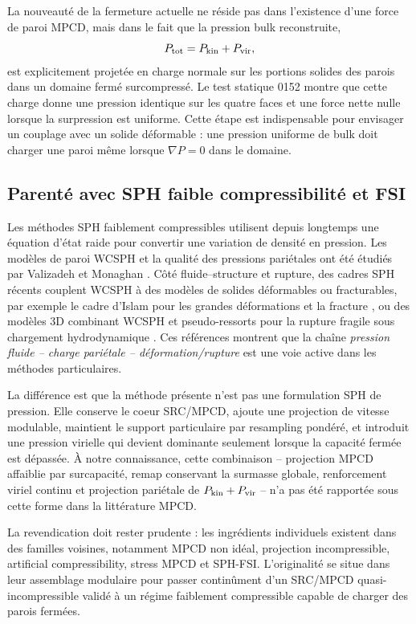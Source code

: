 \documentclass[11pt,a4paper]{article}
\begin{document}
La nouveauté de la fermeture actuelle ne réside pas dans l'existence d'une force de paroi MPCD, mais dans le fait que la pression bulk reconstruite,
\begin{equation}
  P_{\rm tot}=P_{\rm kin}+P_{\rm vir},
\end{equation}
est explicitement projetée en charge normale sur les portions solides des parois dans un domaine fermé surcompressé. Le test statique 0152 montre que cette charge donne une pression identique sur les quatre faces et une force nette nulle lorsque la surpression est uniforme. Cette étape est indispensable pour envisager un couplage avec un solide déformable : une pression uniforme de bulk doit charger une paroi même lorsque \(\nabla P=0\) dans le domaine.

\subsection{Parenté avec SPH faible compressibilité et FSI}

Les méthodes SPH faiblement compressibles utilisent depuis longtemps une équation d'état raide pour convertir une variation de densité en pression. Les modèles de paroi WCSPH et la qualité des pressions pariétales ont été étudiés par Valizadeh et Monaghan \cite{ValizadehMonaghan2015}. Côté fluide--structure et rupture, des cadres SPH récents couplent WCSPH à des modèles de solides déformables ou fracturables, par exemple le cadre d'Islam pour les grandes déformations et la fracture \cite{Islam2024}, ou des modèles 3D combinant WCSPH et pseudo-ressorts pour la rupture fragile sous chargement hydrodynamique \cite{Singh2025}. Ces références montrent que la chaîne \emph{pression fluide -- charge pariétale -- déformation/rupture} est une voie active dans les méthodes particulaires.

La différence est que la méthode présente n'est pas une formulation SPH de pression. Elle conserve le coeur SRC/MPCD, ajoute une projection de vitesse modulable, maintient le support particulaire par resampling pondéré, et introduit une pression virielle qui devient dominante seulement lorsque la capacité fermée est dépassée. À notre connaissance, cette combinaison -- projection MPCD affaiblie par surcapacité, remap conservant la surmasse globale, renforcement viriel continu et projection pariétale de \(P_{\rm kin}+P_{\rm vir}\) -- n'a pas été rapportée sous cette forme dans la littérature MPCD.

La revendication doit rester prudente : les ingrédients individuels existent dans des familles voisines, notamment MPCD non idéal, projection incompressible, artificial compressibility, stress MPCD et SPH-FSI. L'originalité se situe dans leur assemblage modulaire pour passer continûment d'un SRC/MPCD quasi-incompressible validé à un régime faiblement compressible capable de charger des parois fermées.
\end{document}
